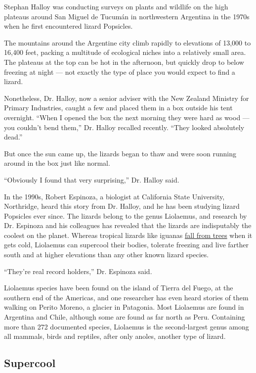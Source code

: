 Stephan Halloy was conducting surveys on plants and wildlife on the high
plateaus around San Miguel de Tucumán in northwestern Argentina in the
1970s when he first encountered lizard Popsicles.

The mountains around the Argentine city climb rapidly to elevations of
13,000 to 16,400 feet, packing a multitude of ecological niches into a
relatively small area. The plateaus at the top can be hot in the
afternoon, but quickly drop to below freezing at night --- not exactly
the type of place you would expect to find a lizard.

Nonetheless, Dr. Halloy, now a senior adviser with the New Zealand
Ministry for Primary Industries, caught a few and placed them in a box
outside his tent overnight. ``When I opened the box the next morning
they were hard as wood --- you couldn't bend them,'' Dr. Halloy recalled
recently. ``They looked absolutely dead.''

But once the sun came up, the lizards began to thaw and were soon
running around in the box just like normal.

``Obviously I found that very surprising,'' Dr. Halloy said.

In the 1990s, Robert Espinoza, a biologist at California State
University, Northridge, heard this story from Dr. Halloy, and he has
been studying lizard Popsicles ever since. The lizards belong to the
genus Liolaemus, and research by Dr. Espinoza and his colleagues has
revealed that the lizards are indisputably the coolest on the planet.
Whereas tropical lizards like iguanas
\href{https://www.nytimes.com/2020/01/21/us/frozen-iguanas-miami-weather.html}{fall
from trees} when it gets cold, Liolaemus can supercool their bodies,
tolerate freezing and live farther south and at higher elevations than
any other known lizard species.

``They're real record holders,'' Dr. Espinoza said.

Liolaemus species have been found on the island of Tierra del Fuego, at
the southern end of the Americas, and one researcher has even heard
stories of them walking on Perito Moreno, a glacier in Patagonia. Most
Liolaemus are found in Argentina and Chile, although some are found as
far north as Peru. Containing more than 272 documented species,
Liolaemus is the second-largest genus among all mammals, birds and
reptiles, after only anoles, another type of lizard.

\hypertarget{supercool}{%
\subsection{Supercool}\label{supercool}}

